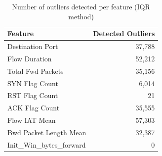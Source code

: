 \begin{table}[H]
\centering
\caption{Number of outliers detected per feature (IQR method)}
\label{tab:outliers}
\begin{tabular}{lr}
\toprule
\textbf{Feature} & \textbf{Detected Outliers} \\
\midrule
Destination Port & 37,788 \\
Flow Duration & 52,212 \\
Total Fwd Packets & 35,156 \\
SYN Flag Count & 6,014 \\
RST Flag Count & 21 \\
ACK Flag Count & 35,555 \\
Flow IAT Mean & 57,303 \\
Bwd Packet Length Mean & 32,387 \\
Init\_Win\_bytes\_forward & 0 \\
\bottomrule
\end{tabular}
\end{table}

